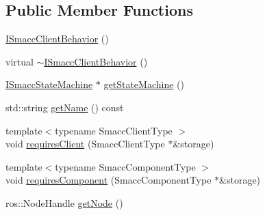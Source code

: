 \subsection*{Public Member Functions}
\begin{DoxyCompactItemize}
\item 
\hyperlink{classsmacc_1_1ISmaccClientBehavior_a12fe603a4b66efe6c190c63da422c7d7}{I\+Smacc\+Client\+Behavior} ()
\item 
virtual \hyperlink{classsmacc_1_1ISmaccClientBehavior_a916a04c467ae5e98c5fc11909f0098f3}{$\sim$\+I\+Smacc\+Client\+Behavior} ()
\item 
\hyperlink{classsmacc_1_1ISmaccStateMachine}{I\+Smacc\+State\+Machine} $\ast$ \hyperlink{classsmacc_1_1ISmaccClientBehavior_a9d55a85bf0a920033805a3c050de2019}{get\+State\+Machine} ()
\item 
std\+::string \hyperlink{classsmacc_1_1ISmaccClientBehavior_a18e4bec9460b010f2894c0f7e7064a34}{get\+Name} () const
\item 
{\footnotesize template$<$typename Smacc\+Client\+Type $>$ }\\void \hyperlink{classsmacc_1_1ISmaccClientBehavior_a32b16e99e3b4cb289414203dc861a440}{requires\+Client} (Smacc\+Client\+Type $\ast$\&storage)
\item 
{\footnotesize template$<$typename Smacc\+Component\+Type $>$ }\\void \hyperlink{classsmacc_1_1ISmaccClientBehavior_a19c6d658c8e809bb93bfdc9b639a3ac3}{requires\+Component} (Smacc\+Component\+Type $\ast$\&storage)
\item 
ros\+::\+Node\+Handle \hyperlink{classsmacc_1_1ISmaccClientBehavior_ad066319af26db612ba2b6d2f1796daad}{get\+Node} ()
\end{DoxyCompactItemize}
